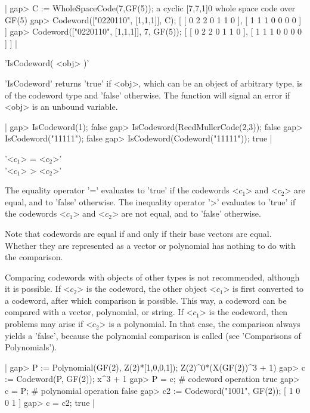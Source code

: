 |    gap> C := WholeSpaceCode(7,GF(5));
    a cyclic [7,7,1]0 whole space code over GF(5)
    gap> Codeword(["0220110", [1,1,1]], C);
    [ [ 0 2 2 0 1 1 0 ], [ 1 1 1 0 0 0 0 ] ]
    gap> Codeword(["0220110", [1,1,1]], 7, GF(5));
    [ [ 0 2 2 0 1 1 0 ], [ 1 1 1 0 0 0 0 ] ] |


'IsCodeword( <obj> )'

'IsCodeword' returns 'true' if <obj>, which can be an object of arbitrary
type, is of  the codeword type and 'false'  otherwise.  The function will
signal an error if <obj> is an unbound variable.

|    gap> IsCodeword(1);
    false
    gap> IsCodeword(ReedMullerCode(2,3));
    false
    gap> IsCodeword("11111");
    false
    gap> IsCodeword(Codeword("11111"));
    true |


'<$c_1$> = <$c_2$>'\\
'<$c_1$> \<> <$c_2$>'

The equality operator  '=' evaluates to  'true' if the  codewords <$c_1$>
and <$c_2$> are equal, and to  'false' otherwise. The inequality operator
'\<>'  evaluates to 'true' if  the codewords <$c_1$>  and <$c_2$> are not
equal, and to 'false' otherwise.

Note  that codewords are  equal if  and only  if  their base  vectors are
equal.   Whether they  are  represented  as a vector  or  polynomial  has
nothing to do with the comparison.

Comparing codewords with objects    of other types is  not   recommended,
although it is  possible. If <$c_2$> is  the  codeword, the  other object
<$c_1$>  is first  converted to a   codeword, after  which  comparison is
possible. This way, a codeword can be compared with a vector, polynomial,
or string. If <$c_1$> is the codeword, then problems may arise if <$c_2$>
is a polynomial.  In that case, the comparison  always yields  a 'false',
because the  polynomial  comparison    is called (see    'Comparisons  of
Polynomials').

|    gap> P := Polynomial(GF(2), Z(2)*[1,0,0,1]);
    Z(2)^0*(X(GF(2))^3 + 1)
    gap> c := Codeword(P, GF(2));
    x^3 + 1
    gap> P = c;        # codeword operation
    true
    gap> c = P;        # polynomial operation
    false
    gap> c2 := Codeword("1001", GF(2));
    [ 1 0 0 1 ]
    gap> c = c2;
    true |

